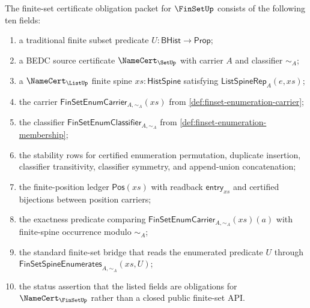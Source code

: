 \begin{definition}
\label{def:finset-namecert-obligation-packet}
The finite-set certificate obligation packet for $\FinSetUp$ consists of the following ten fields:
\begin{enumerate}
  \item a traditional finite subset predicate $U:\mathsf{BHist}\to\mathsf{Prop}$;
  \item a BEDC source certificate $\NameCert_{\SetUp}$ with carrier $A$ and classifier $\sim_A$;
  \item a $\NameCert_{\ListUp}$ finite spine $xs:\mathsf{HistSpine}$ satisfying $\mathsf{ListSpineRep}_A(e,xs)$;
  \item the carrier $\mathsf{FinSetEnumCarrier}_{A,\sim_A}(xs)$ from \autoref{def:finset-enumeration-carrier};
  \item the classifier $\mathsf{FinSetEnumClassifier}_{A,\sim_A}$ from \autoref{def:finset-enumeration-membership};
  \item the stability rows for certified enumeration permutation, duplicate insertion, classifier transitivity, classifier symmetry, and append-union concatenation;
  \item the finite-position ledger $\mathsf{Pos}(xs)$ with readback $\mathsf{entry}_{xs}$ and certified bijections between position carriers;
  \item the exactness predicate comparing $\mathsf{FinSetEnumCarrier}_{A,\sim_A}(xs)(a)$ with finite-spine occurrence modulo $\sim_A$;
  \item the standard finite-set bridge that reads the enumerated predicate $U$ through $\mathsf{FinSetSpineEnumerates}_{A,\sim_A}(xs,U)$;
  \item the status assertion that the listed fields are obligations for $\NameCert_{\FinSetUp}$ rather than a closed public finite-set API.
\end{enumerate}
\end{definition}

